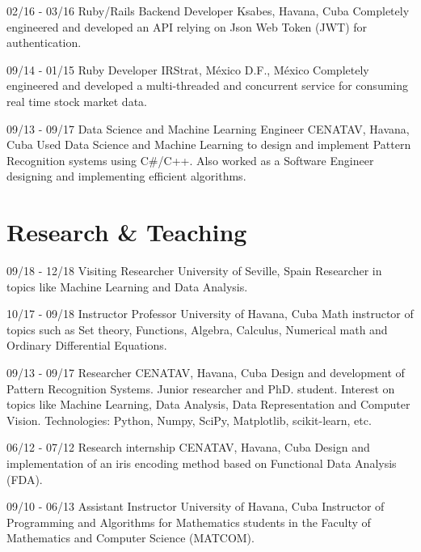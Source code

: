 \documentclass[]{friggeri-cv}
\begin{document}
\begin{entrylist}
  \entry
    {02/16 - 03/16}
    {Ruby/Rails Backend Developer}
    {Ksabes, Havana, Cuba}
    {Completely engineered and developed an API relying on Json Web Token (JWT) for authentication.\\}
  
  \entry
    {09/14 - 01/15}
    {Ruby Developer}
    {IRStrat, México D.F., México}
    {Completely engineered and developed a multi-threaded and concurrent service for consuming real time stock market data.\\}
    
  \entry
    {09/13 - 09/17}
    {Data Science and Machine Learning Engineer}
    {CENATAV, Havana, Cuba}
    {Used Data Science and Machine Learning to design and implement Pattern Recognition systems using C\#/C++. Also worked as a Software Engineer designing and implementing efficient algorithms.\\}
\end{entrylist}

\pagebreak

\section{Research \& Teaching}
\begin{entrylist}
  \entry
    {09/18 - 12/18}
    {Visiting Researcher}
    {University of Seville, Spain}
    {Researcher in topics like Machine Learning and Data Analysis.\\}

  \entry
    {10/17 - 09/18}
    {Instructor Professor}
    {University of Havana, Cuba}
    {Math instructor of topics such as Set theory, Functions, Algebra, Calculus, Numerical math and Ordinary Differential Equations.\\}

  \entry
    {09/13 - 09/17}
    {Researcher}
    {CENATAV, Havana, Cuba}
    {Design and development of Pattern Recognition Systems. Junior researcher and PhD. student. Interest on topics like Machine Learning, Data Analysis, Data Representation and Computer Vision. Technologies: Python, Numpy, SciPy, Matplotlib, scikit-learn, etc.\\}

  \entry
    {06/12 - 07/12}
    {Research internship}
    {CENATAV, Havana, Cuba}
    {Design and implementation of an iris encoding method based on Functional Data Analysis (FDA).\\}
    
  \entry
    {09/10 - 06/13}
    {Assistant Instructor}
    {University of Havana, Cuba}
    {Instructor of Programming and Algorithms for Mathematics students in the Faculty of Mathematics and Computer Science (MATCOM).\\}
\end{entrylist}
\end{document}
